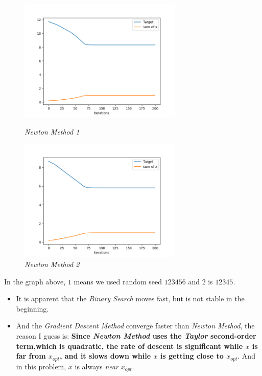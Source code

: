 \documentclass[12pt, a4paper, oneside]{article}
\begin{document}
\begin{figure}[H]
    \begin{minipage}[H]{0.5\linewidth} %
            \centering
            \includegraphics[width=7.8cm]{T of N1.png}
            \caption{\textit{Newton Method 1}}
     \end{minipage}
     \begin{minipage}[H]{0.5\linewidth}
        \hspace{0.2mm}
         \includegraphics[width=7.8cm]{T of N2.png}
         \caption{\textit{Newton Method 2}}
      \end{minipage}
\end{figure}
In the graph above, $1$ means we used random seed $123456$ and $2$ is $12345$.\\
\begin{itemize}
    \item It is apparent that the \textit{Binary Search} moves fast, but is not stable in the beginning.
    \item 
    {
        And the \textit{Gradient Descent Method} converge faster than \textit{Newton Method}, 
        the reason I guess is: \textbf{Since \textit{Newton Method} uses the \textit{Taylor} second-order term,which is quadratic, 
        the rate of descent is significant while $x$ is far from $x_{opt}$, and it slows down while $x$ is getting close to $x_{opt}$}.
        And in this problem, $x$ is always \textit{near} $x_{opt}$.
    }
\end{itemize}
\end{document}

